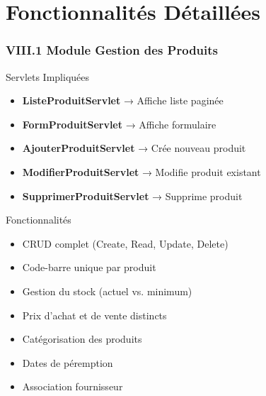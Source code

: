 \documentclass[11pt, aspectratio=169]{beamer}
\begin{document}

\section{Fonctionnalités Détaillées}

\begin{frame}
    \frametitle{VIII.1 Module Gestion des Produits}
    
    \begin{block}{Servlets Impliquées}
        \begin{itemize}
            \item[\faList] \textbf{ListeProduitServlet} → Affiche liste paginée
            \item[\faWrench] \textbf{FormProduitServlet} → Affiche formulaire
            \item[\faPlus] \textbf{AjouterProduitServlet} → Crée nouveau produit
            \item[\faEdit] \textbf{ModifierProduitServlet} → Modifie produit existant
            \item[\faTrash] \textbf{SupprimerProduitServlet} → Supprime produit
        \end{itemize}
    \end{block}
    
    \vspace{0.8cm}
    
    \begin{block}{Fonctionnalités}
        \begin{itemize}
            \item CRUD complet (Create, Read, Update, Delete)
            \item Code-barre unique par produit
            \item Gestion du stock (actuel vs. minimum)
            \item Prix d'achat et de vente distincts
            \item Catégorisation des produits
            \item Dates de péremption
            \item Association fournisseur
        \end{itemize}
    \end{block}
\end{frame}
\end{document}
